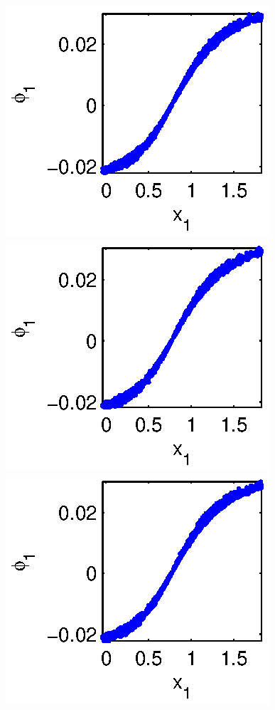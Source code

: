 \begin{figure}[!t]
\includegraphics[width=\figwidth]{data_linear_slow1}
\includegraphics[width=\figwidth]{data_linear_slow2}
\includegraphics[width=\figwidth]{data_linear_slow3}


\end{figure}
